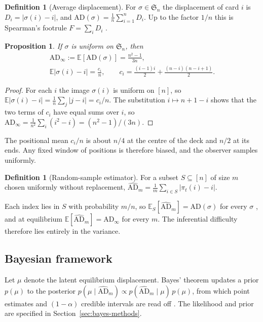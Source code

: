 \documentclass[ba]{imsart}
\theoremstyle{plain}
\newtheorem{proposition}[theorem]{Proposition}
\theoremstyle{definition}
\newtheorem{definition}[theorem]{Definition}
\newcommand{\E}{\mathbb{E}}
\newcommand{\AD}{\mathrm{AD}}
\newcommand{\ADh}{\widehat{\mathrm{AD}}}
\newcommand{\Sym}{\mathfrak{S}}
\begin{document}
\begin{definition}[Average displacement]\label{def:ad}
For $\sigma\in\Sym_n$ the displacement of card $i$ is $D_i=|\sigma(i)-i|$, and $\AD(\sigma)=\frac1n\sum_{i=1}^n D_i$. Up to the factor $1/n$ this is Spearman's footrule $F=\sum_i D_i$ \citep{DiaconisGraham1977}.
\end{definition}

\begin{proposition}\label{prop:mean}
If $\sigma$ is uniform on $\Sym_n$, then
\begin{equation}\label{eq:mean}
\begin{gathered}
\AD_\infty:=\E[\AD(\sigma)]=\frac{n^2-1}{3n},\\
\E|\sigma(i)-i|=\frac{c_i}{n},\qquad
c_i=\frac{(i-1)i}{2}+\frac{(n-i)(n-i+1)}{2}.
\end{gathered}
\end{equation}
\end{proposition}

\begin{proof}
For each $i$ the image $\sigma(i)$ is uniform on $[n]$, so $\E|\sigma(i)-i|=\frac1n\sum_j|j-i|=c_i/n$. The substitution $i\mapsto n+1-i$ shows that the two terms of $c_i$ have equal sums over $i$, so $\AD_\infty=\frac{1}{n^2}\sum_i(i^2-i)=(n^2-1)/(3n)$.
\end{proof}

The positional mean $c_i/n$ is about $n/4$ at the centre of the deck and $n/2$ at its ends. Any fixed window of positions is therefore biased, and the observer samples uniformly.

\begin{definition}[Random-sample estimator]\label{def:estimator}
For a subset $S\subseteq[n]$ of size $m$ chosen uniformly without replacement, $\ADh_m=\frac1m\sum_{i\in S}|\pi_t(i)-i|$.
\end{definition}

Each index lies in $S$ with probability $m/n$, so $\E_S[\ADh_m]=\AD(\sigma)$ for every $\sigma$ \citep{Cochran1977}, and at equilibrium $\E[\ADh_m]=\AD_\infty$ for every $m$. The inferential difficulty therefore lies entirely in the variance.

\subsection{Bayesian framework}

Let $\mu$ denote the latent equilibrium displacement. Bayes' theorem updates a prior $p(\mu)$ to the posterior $p(\mu\mid\ADh_m)\propto p(\ADh_m\mid\mu)\,p(\mu)$, from which point estimates and $(1-\alpha)$ credible intervals are read off \citep{Bishop2006,Robert2007}. The likelihood and prior are specified in Section~\ref{sec:bayes-methods}.
\end{document}
